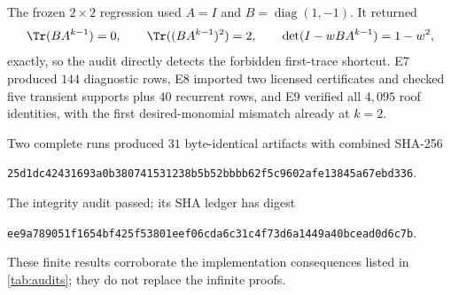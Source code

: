 The frozen $2\times2$ regression used
$A=I$ and $B=\operatorname{diag}(1,-1)$.  It returned
\[
 \Tr(BA^{k-1})=0,
 \qquad
 \Tr((BA^{k-1})^2)=2,
 \qquad
 \det(I-wBA^{k-1})=1-w^2,
\]
exactly, so the audit directly detects the forbidden first-trace shortcut.
E7 produced $144$ diagnostic rows, E8 imported two licensed certificates
and checked five transient supports plus $40$ recurrent rows, and E9
verified all $4{,}095$ roof identities, with the first desired-monomial
mismatch already at $k=2$.

Two complete runs produced $31$ byte-identical artifacts with combined
SHA-256
\begin{center}\small
\texttt{25d1dc42431693a0b380741531238b5b52bbbb62f5c9602afe13845a67ebd336}.
\end{center}
The integrity audit passed; its SHA ledger has digest
\begin{center}\small
\texttt{ee9a789051f1654bf425f53801eef06cda6c31c4f73d6a1449a40bcead0d6c7b}.
\end{center}
These finite results corroborate the implementation consequences listed in
\cref{tab:audits}; they do not replace the infinite proofs.
